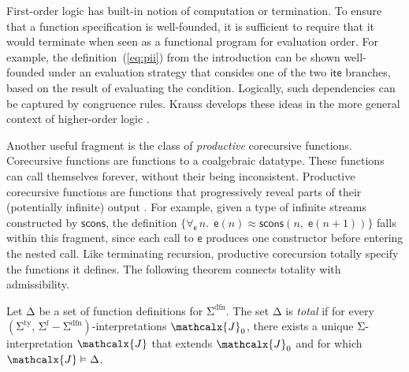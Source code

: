 \documentclass[runningheads,a4paper]{llncs}
\renewcommand\models{\mathrel{\vDash}}
\newcommand\DDD{\Delta}
\newcommand{\con}[1]{\mathsf{#1}}
\let\const=\con
\let\oldSigma=\Sigma
\def\Sigma{\mathrm{\oldSigma}}
\let\oldDelta=\Delta
\def\Delta{\mathrm{\oldDelta}}
\newcommand{\teq}{\approx}
\newcommand{\J}{\mathcalx{J}}
\newcommand{\stypes}[1]{#1^\mathrm{ty}}
\newcommand{\sfuns}[1]{#1^\mathrm{f}}
\newcommand{\sfundefs}[1]{#1^\mathrm{dfn}}
\newcommand{\lite}{\con{ite}}
\newcommand{\forallf}[1]{\forall_{\!#1\:}}
\begin{document}
First-order logic has built-in notion of computation or termination. To ensure
that a function specification is well-founded, it is sufficient to require that
it would terminate when seen as a functional program for 
evaluation order. For example, the definition~(\ref{eq:pii}) from the
introduction can be shown well-founded under an evaluation strategy that
consides one of the two $\lite$ branches, based on the result of evaluating the
condition. Logically, such dependencies can be captured by congruence rules.
Krauss develops these ideas in the more general context of
higher-order logic \cite[Section 2]{krauss-2009-phd}.

Another useful fragment is the class of \emph{productive} corecursive
functions. Corecursive functions are functions to a coalgebraic datatype.
These functions can call themselves forever, without their being inconsistent.
Productive corecursive functions are functions that progressively reveal parts
of their (potentially infinite)
output \cite{turner-1995,mcbride-productive}.
For example, given a type of infinite streams constructed by $\con{scons}$,
the definition
$\{\forallf{\const{e}} n.\;\, \const{e}(n) \teq \con{scons}(n,\; \const{e}(n + 1))\}$
falls within this fragment, since each call to $\const{e}$ produces one
constructor before entering the nested call. Like terminating recursion,
productive corecursion totally specify the functions it defines. The
following theorem connects totality with admissibility.

\begin{definition}\rm
Let $\DDD$ be a set of function definitions for $\sfundefs{\Sigma}$. The set
$\DDD$ is \emph{total} if for every
$(\stypes{\Sigma},\, \sfuns{\Sigma} - \sfundefs{\Sigma})$-interpretations
$\J_0$, there exists a unique
$\Sigma$-interpretation $\J$ that extends $\J_0$
and for which $\J \models \DDD$.
\end{definition}
\end{document}
